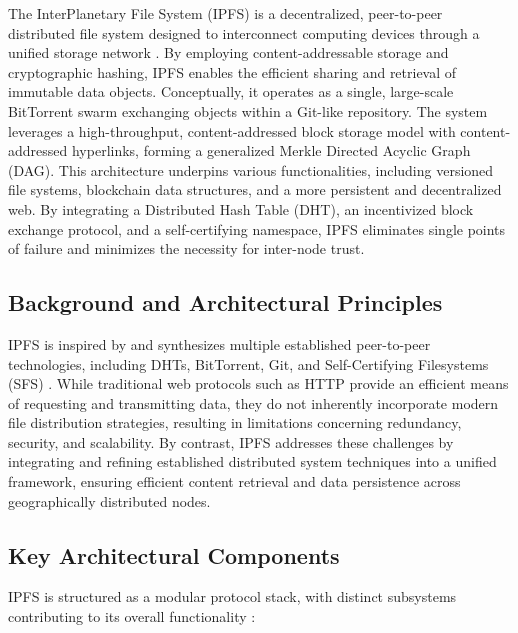 \documentclass{article}
\begin{document}
The InterPlanetary File System (IPFS) is a decentralized, peer-to-peer distributed file system designed to interconnect computing devices through a unified storage network \cite{benet2014ipfs}. By employing content-addressable storage and cryptographic hashing, IPFS enables the efficient sharing and retrieval of immutable data objects. Conceptually, it operates as a single, large-scale BitTorrent swarm exchanging objects within a Git-like repository. The system leverages a high-throughput, content-addressed block storage model with content-addressed hyperlinks, forming a generalized Merkle Directed Acyclic Graph (DAG). This architecture underpins various functionalities, including versioned file systems, blockchain data structures, and a more persistent and decentralized web. By integrating a Distributed Hash Table (DHT), an incentivized block exchange protocol, and a self-certifying namespace, IPFS eliminates single points of failure and minimizes the necessity for inter-node trust.

\subsection{Background and Architectural Principles}

IPFS is inspired by and synthesizes multiple established peer-to-peer technologies, including DHTs, BitTorrent, Git, and Self-Certifying Filesystems (SFS) \cite{benet2014ipfs}. While traditional web protocols such as HTTP provide an efficient means of requesting and transmitting data, they do not inherently incorporate modern file distribution strategies, resulting in limitations concerning redundancy, security, and scalability. By contrast, IPFS addresses these challenges by integrating and refining established distributed system techniques into a unified framework, ensuring efficient content retrieval and data persistence across geographically distributed nodes.

\subsection{Key Architectural Components}

IPFS is structured as a modular protocol stack, with distinct subsystems contributing to its overall functionality \cite{benet2014ipfs}:
\end{document}
